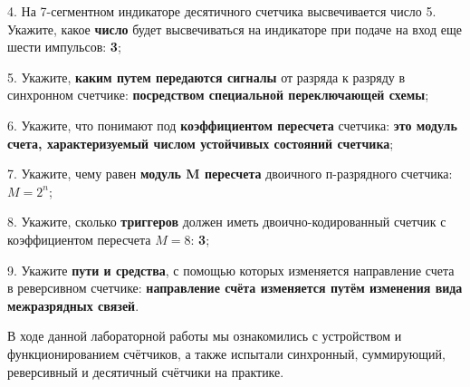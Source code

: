 \documentclass[spec, och, otchet, hidelinks]{SCWorks}
\begin{document}
\par 4. На 7-сегментном индикаторе десятичного счетчика высвечивается число 5. Укажите, какое \textbf{число} будет высвечиваться на индикаторе при 
подаче на вход еще шести импульсов: \textbf{3};

\par 5. Укажите, \textbf{каким путем передаются сигналы} от разряда к разряду в синхронном
счетчике: \textbf{посредством специальной переключающей схемы};

\par 6. Укажите, что понимают под \textbf{коэффициентом пересчета} счетчика: \textbf{это модуль счета, характеризуемый числом устойчивых состояний счетчика};

\par 7. Укажите, чему равен \textbf{модуль M пересчета} двоичного п-разрядного счетчика: \textbf{$ M = 2 ^ n $};

\par 8. Укажите, сколько \textbf{триггеров} должен иметь двоично-кодированный счетчик с коэффициентом пересчета $ M = 8 $: \textbf{3};

\par 9. Укажите \textbf{пути и средства}, с помощью которых изменяется направление счета в реверсивном счетчике: \textbf{направление счёта изменяется путём изменения вида межразрядных связей}.

\newpage

\conclusion

В ходе данной лабораторной работы мы ознакомились с устройством и функционированием счётчиков, а также испытали синхронный, суммирующий, реверсивный 
и десятичный счётчики на практике.
\end{document}
